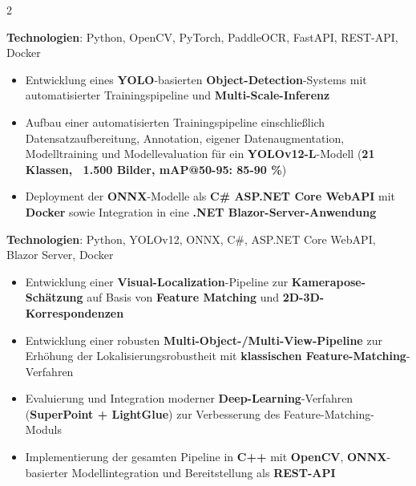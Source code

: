\documentclass[10pt,a4paper,withhyper]{../altacv}
\begin{document}
\begin{paracol}{2}
  \vspace{0.5em}

  \textbf{Technologien}: Python, OpenCV, PyTorch, PaddleOCR, FastAPI, REST-API, Docker

  \vspace{0.5em}


  \vspace{0.5em}

  \begin{itemize}
    \item Entwicklung eines \textbf{YOLO}-basierten \textbf{Object-Detection}-Systems mit automatisierter Trainingspipeline und \textbf{Multi-Scale-Inferenz}
    \item Aufbau einer automatisierten Trainingspipeline einschließlich Datensatzaufbereitung, Annotation, eigener Datenaugmentation, Modelltraining und Modellevaluation für ein \textbf{YOLOv12-L}-Modell (\textbf{21 Klassen, ~1.500 Bilder, mAP@50-95: 85-90 \%})
    \item Deployment der \textbf{ONNX}-Modelle als \textbf{C\# ASP.NET Core WebAPI} mit \textbf{Docker} sowie Integration in eine \textbf{.NET Blazor-Server-Anwendung}
  \end{itemize}

  \vspace{0.5em}

  \textbf{Technologien}: Python, YOLOv12, ONNX, C\#, ASP.NET Core WebAPI, Blazor Server, Docker

  \vspace{0.5em}


  \vspace{0.5em}

  \begin{itemize}
    \item Entwicklung einer \textbf{Visual-Localization}-Pipeline zur \textbf{Kamerapose-Schätzung} auf Basis von \textbf{Feature Matching} und \textbf{2D-3D-Korrespondenzen}
    \item Entwicklung einer robusten \textbf{Multi-Object-/Multi-View-Pipeline} zur Erhöhung der Lokalisierungsrobustheit mit \textbf{klassischen Feature-Matching}-Verfahren
    \item Evaluierung und Integration moderner \textbf{Deep-Learning}-Verfahren (\textbf{SuperPoint + LightGlue}) zur Verbesserung des Feature-Matching-Moduls
    \item Implementierung der gesamten Pipeline in \textbf{C++} mit \textbf{OpenCV}, \textbf{ONNX}-basierter Modellintegration und Bereitstellung als \textbf{REST-API}
  \end{itemize}


\end{paracol}
\end{document}

